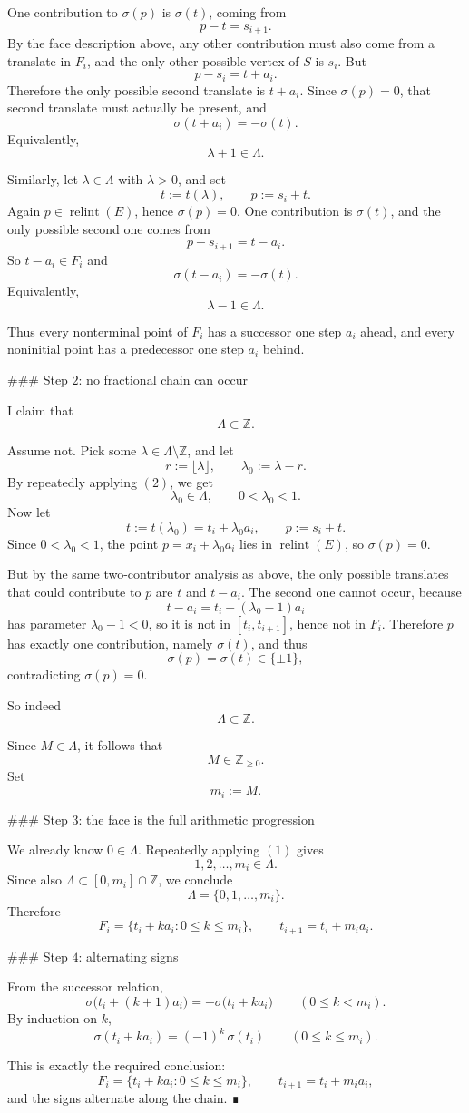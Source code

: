 One contribution to \(\sigma(p)\) is \(\sigma(t)\), coming from
\[
p-t=s_{i+1}.
\]
By the face description above, any other contribution must also come from a translate in \(F_i\), and the only other possible vertex of \(S\) is \(s_i\). But
\[
p-s_i=t+a_i.
\]
Therefore the only possible second translate is \(t+a_i\). Since \(\sigma(p)=0\), that second translate must actually be present, and
\[
\sigma(t+a_i)=-\sigma(t).
\]
Equivalently,
\[
\lambda+1\in\Lambda.
\tag{1}
\]

Similarly, let \(\lambda\in\Lambda\) with \(\lambda>0\), and set
\[
t:=t(\lambda),\qquad p:=s_i+t.
\]
Again \(p\in \operatorname{relint}(E)\), hence \(\sigma(p)=0\). One contribution is \(\sigma(t)\), and the only possible second one comes from
\[
p-s_{i+1}=t-a_i.
\]
So \(t-a_i\in F_i\) and
\[
\sigma(t-a_i)=-\sigma(t).
\]
Equivalently,
\[
\lambda-1\in\Lambda.
\tag{2}
\]

Thus every nonterminal point of \(F_i\) has a successor one step \(a_i\) ahead, and every noninitial point has a predecessor one step \(a_i\) behind.

### Step \(2\): no fractional chain can occur

I claim that
\[
\Lambda\subset \mathbb{Z}.
\]

Assume not. Pick some \(\lambda\in\Lambda\setminus\mathbb{Z}\), and let
\[
r:=\lfloor \lambda\rfloor,\qquad \lambda_0:=\lambda-r.
\]
By repeatedly applying \((2)\), we get
\[
\lambda_0\in\Lambda,
\qquad 0<\lambda_0<1.
\]
Now let
\[
t:=t(\lambda_0)=t_i+\lambda_0 a_i,\qquad p:=s_i+t.
\]
Since \(0<\lambda_0<1\), the point \(p=x_i+\lambda_0 a_i\) lies in \(\operatorname{relint}(E)\), so \(\sigma(p)=0\).

But by the same two-contributor analysis as above, the only possible translates that could contribute to \(p\) are \(t\) and \(t-a_i\). The second one cannot occur, because
\[
t-a_i=t_i+(\lambda_0-1)a_i
\]
has parameter \(\lambda_0-1<0\), so it is not in \([t_i,t_{i+1}]\), hence not in \(F_i\). Therefore \(p\) has exactly one contribution, namely \(\sigma(t)\), and thus
\[
\sigma(p)=\sigma(t)\in\{\pm1\},
\]
contradicting \(\sigma(p)=0\).

So indeed
\[
\Lambda\subset\mathbb{Z}.
\]

Since \(M\in\Lambda\), it follows that
\[
M\in\mathbb{Z}_{\ge 0}.
\]
Set
\[
m_i:=M.
\]

### Step \(3\): the face is the full arithmetic progression

We already know \(0\in\Lambda\). Repeatedly applying \((1)\) gives
\[
1,2,\dots,m_i\in\Lambda.
\]
Since also \(\Lambda\subset[0,m_i]\cap\mathbb{Z}\), we conclude
\[
\Lambda=\{0,1,\dots,m_i\}.
\]
Therefore
\[
F_i=\{t_i+k a_i:0\le k\le m_i\},
\qquad
t_{i+1}=t_i+m_i a_i.
\]

### Step \(4\): alternating signs

From the successor relation,
\[
\sigma\bigl(t_i+(k+1)a_i\bigr)=-\sigma\bigl(t_i+k a_i\bigr)
\qquad (0\le k<m_i).
\]
By induction on \(k\),
\[
\sigma(t_i+k a_i)=(-1)^k\,\sigma(t_i)
\qquad (0\le k\le m_i).
\]

This is exactly the required conclusion:
\[
F_i=\{t_i+k a_i:0\le k\le m_i\},
\qquad
t_{i+1}=t_i+m_i a_i,
\]
and the signs alternate along the chain. ∎
